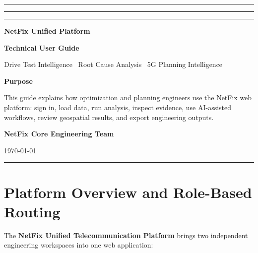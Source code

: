 \documentclass[11pt,a4paper]{article}
\begin{document}
\begin{titlepage}
\thispagestyle{empty}
\centering
\vspace*{1.5cm}

{\color{netfixBlue}\rule{0.22\textwidth}{1.2pt}}\hspace{0.4cm}
{\color{netfixMagenta}\rule{0.08\textwidth}{1.2pt}}\hspace{0.4cm}
{\color{netfixBlue}\rule{0.22\textwidth}{1.2pt}}

\vspace{1.1cm}
{\fontsize{30}{34}\selectfont\bfseries\color{netfixNavy}NetFix Unified Platform}\par
\vspace{0.3cm}
{\fontsize{19}{23}\selectfont\bfseries\color{netfixBlue}Technical User Guide}\par
\vspace{0.4cm}
{\large\color{midGray}Drive Test Intelligence \textbullet\ Root Cause Analysis \textbullet\ 5G Planning Intelligence}\par

\vspace{1.35cm}
\begin{tcolorbox}[
  width=0.86\textwidth,
  colback=softBlue,
  colframe=netfixBlue,
  boxrule=0.8pt,
  arc=3mm,
  left=12pt,right=12pt,top=12pt,bottom=12pt]
\centering
\textbf{Purpose}\par
\vspace{2pt}
This guide explains how optimization and planning engineers use the NetFix web platform: sign in, load data, run analysis, inspect evidence, use AI-assisted workflows, review geospatial results, and export engineering outputs.
\end{tcolorbox}

\vfill
{\large\bfseries NetFix Core Engineering Team}\par
\vspace{0.2cm}
{\color{midGray}\today}\par
\vspace{0.8cm}
{\color{ruleGray}\rule{0.88\textwidth}{0.6pt}}
\end{titlepage}

\tableofcontents
\newpage

\section{Platform Overview and Role-Based Routing}
The \textbf{NetFix Unified Telecommunication Platform} brings two independent engineering workspaces into one web application:
\end{document}
